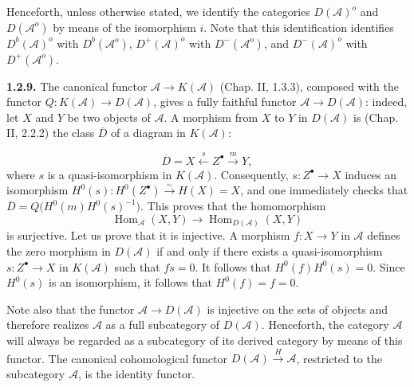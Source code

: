 \clearpage
{}%
\begingroup\small\setlength{\parskip}{0pt}\setlength{\emergencystretch}{1.5em}
\setlength{\abovedisplayskip}{4pt plus 2pt minus 2pt}%
\setlength{\belowdisplayskip}{4pt plus 2pt minus 2pt}%

Henceforth, unless otherwise stated, we identify the categories
$D(\mathcal A)^o$ and $D(\mathcal A^o)$ by means of the isomorphism $i$.
Note that this identification identifies $D^b(\mathcal A)^o$ with
$D^b(\mathcal A^o)$, $D^+(\mathcal A)^o$ with $D^-(\mathcal A^o)$, and
$D^-(\mathcal A)^o$ with $D^+(\mathcal A^o)$.

\medskip\noindent\textbf{1.2.9.}\quad
The canonical functor $\mathcal A\longrightarrow K(\mathcal A)$
(Chap. II, 1.3.3), composed with the functor
$Q\colon K(\mathcal A)\longrightarrow D(\mathcal A)$, gives a fully
faithful functor $\mathcal A\longrightarrow D(\mathcal A)$: indeed, let
$X$ and $Y$ be two objects of $\mathcal A$. A morphism from $X$ to $Y$ in
$D(\mathcal A)$ is (Chap. II, 2.2.2) the class $\overline D$ of a diagram in
$K(\mathcal A)$:

\[
\overline D=X\xleftarrow{\ s\ }Z^\bullet\xrightarrow{\ m\ }Y,
\]
where $s$ is a quasi-isomorphism in $K(\mathcal A)$. Consequently,
$s\colon Z^\bullet\longrightarrow X$ induces an isomorphism
$H^0(s)\colon H^0(Z^\bullet)\xrightarrow{\sim}H(X)=X$, and one immediately
checks that $\overline D=Q\bigl(H^0(m)H^0(s)^{-1}\bigr)$. This proves that
the homomorphism
\[
\operatorname{Hom}_{\mathcal A}(X,Y)\longrightarrow
\operatorname{Hom}_{D(\mathcal A)}(X,Y)
\]
is surjective. Let us prove that it is injective. A morphism
$f\colon X\longrightarrow Y$ in $\mathcal A$ defines the zero morphism in
$D(\mathcal A)$ if and only if there exists a quasi-isomorphism
$s\colon Z^\bullet\longrightarrow X$ in $K(\mathcal A)$ such that $fs=0$.
It follows that $H^0(f)H^0(s)=0$. Since $H^0(s)$ is an isomorphism, it
follows that $H^0(f)=f=0$.

Note also that the functor $\mathcal A\longrightarrow D(\mathcal A)$ is
injective on the sets of objects and therefore realizes $\mathcal A$ as a
full subcategory of $D(\mathcal A)$. Henceforth, the category $\mathcal A$
will always be regarded as a subcategory of its derived category by means of
this functor. The canonical cohomological functor
$D(\mathcal A)\xrightarrow{H}\mathcal A$, restricted to the subcategory
$\mathcal A$, is the identity functor.

